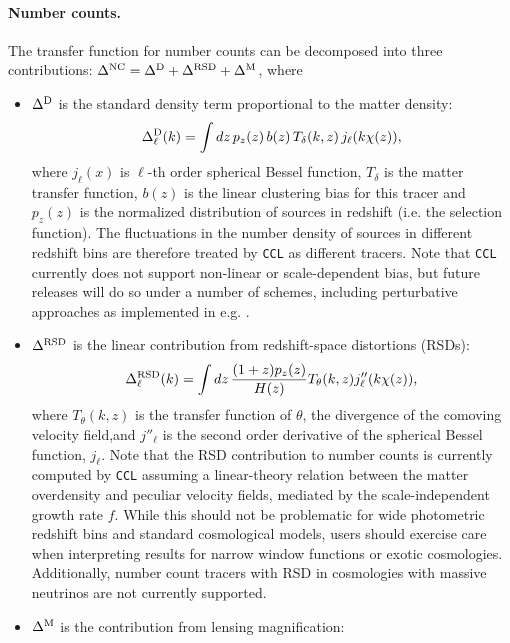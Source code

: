 \documentclass[\docopts]{\docclass}
\newcommand{\ccl}{{\tt CCL}\xspace}
\begin{document}
\paragraph{\bf Number counts.} The transfer function for number counts can be decomposed into three contributions: $\Delta^{\rm NC}=\Delta^{\rm D}+\Delta^{\rm RSD}+\Delta^{\rm M}$, where
\begin{itemize}
  \item $\Delta^{\rm D}$ is the standard density term proportional to the matter density:
        \begin{equation}\label{eq:transfer_nc}
          \Delta^{\rm D}_\ell(k)=\int dz\,p_z(z)\,b(z)\,T_\delta(k,z)\,j_\ell(k\chi(z)),
        \end{equation}
        where $j_\ell(x)$ is $\ell$-th order spherical Bessel function, $T_\delta$ is the matter transfer function, $b(z)$ is the linear clustering bias for this tracer and $p_z(z)$ is the normalized distribution of sources in redshift (i.e. the selection function). The fluctuations in the number density of sources in different redshift bins are therefore treated by \ccl as different tracers. Note that \ccl currently does not support non-linear or scale-dependent bias, but future releases will do so under a number of schemes, including perturbative approaches as implemented in e.g. \cite{FASTPT}.
  \item $\Delta^{\rm RSD}$ is the linear contribution from redshift-space distortions (RSDs):
        \begin{equation}\label{eq:transfer_rsd}
          \Delta^{\rm RSD}_\ell(k)=\int dz\,\frac{(1+z) p_z(z)}{H(z)}T_\theta(k,z) j_\ell''(k\chi(z)),
        \end{equation}
        where $T_\theta(k,z)$ is the transfer function of $\theta$, the divergence of the comoving velocity field,and $j''_\ell$ is the second order derivative of the spherical Bessel function, $j_\ell$. Note that the RSD contribution to number counts is currently computed by \ccl assuming a linear-theory relation between the matter overdensity and peculiar velocity fields, mediated by the scale-independent growth rate $f$. While this should not be problematic for wide photometric redshift bins and standard cosmological models, users should exercise care when interpreting results for narrow window functions or exotic cosmologies. Additionally, number count tracers with RSD in cosmologies with massive neutrinos are not currently supported.
  \item $\Delta^{\rm M}$ is the contribution from lensing magnification:

\end{itemize}
\end{document}
